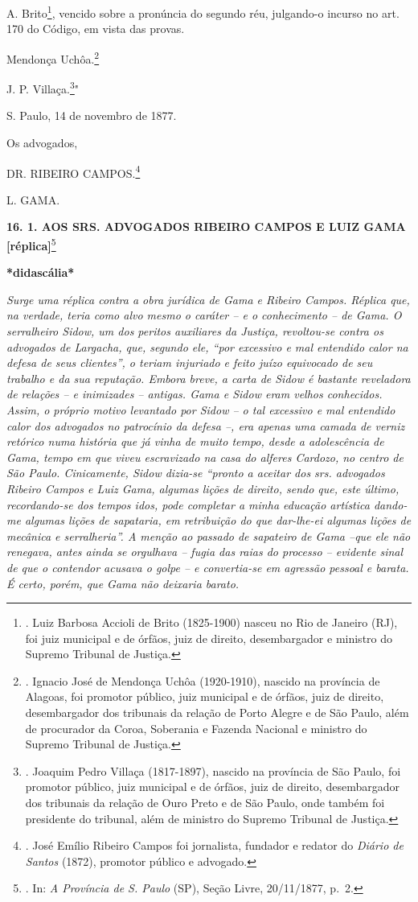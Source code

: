 A. Brito\footnote{. Luiz Barbosa Accioli de Brito (1825-1900) nasceu no
  Rio de Janeiro (RJ), foi juiz municipal e de órfãos, juiz de direito,
  desembargador e ministro do Supremo Tribunal de Justiça.}, vencido
sobre a pronúncia do segundo réu, julgando-o incurso no art. 170 do
Código, em vista das provas.

Mendonça Uchôa.\footnote{. Ignacio José de Mendonça Uchôa (1920-1910),
  nascido na província de Alagoas, foi promotor público, juiz municipal
  e de órfãos, juiz de direito, desembargador dos tribunais da relação
  de Porto Alegre e de São Paulo, além de procurador da Coroa, Soberania
  e Fazenda Nacional e ministro do Supremo Tribunal de Justiça.}

J. P. Villaça.\footnote{. Joaquim Pedro Villaça (1817-1897), nascido na
  província de São Paulo, foi promotor público, juiz municipal e de
  órfãos, juiz de direito, desembargador dos tribunais da relação de
  Ouro Preto e de São Paulo, onde também foi presidente do tribunal,
  além de ministro do Supremo Tribunal de Justiça.}"

S. Paulo, 14 de novembro de 1877.

Os advogados,

DR. RIBEIRO CAMPOS.\footnote{. José Emílio Ribeiro Campos foi
  jornalista, fundador e redator do \emph{Diário de Santos} (1872),
  promotor público e advogado.}

L. GAMA.

\textbf{16. 1. AOS SRS. ADVOGADOS RIBEIRO CAMPOS E LUIZ GAMA
{[}réplica{]}}\footnote{. In: \emph{A Província de S. Paulo} (SP), Seção
  Livre, 20/11/1877, p.~2.}

\textbf{*didascália*}

\emph{Surge uma réplica contra a obra jurídica de Gama e Ribeiro Campos.
Réplica que, na verdade, teria como alvo mesmo o caráter -- e o
conhecimento -- de Gama. O serralheiro Sidow, um dos peritos auxiliares
da Justiça, revoltou-se contra os advogados de Largacha, que, segundo
ele, ``por excessivo e mal entendido calor na defesa de seus clientes'',
o teriam injuriado e feito juízo equivocado de seu trabalho e da sua
reputação. Embora breve, a carta de Sidow é bastante reveladora de
relações -- e inimizades -- antigas. Gama e Sidow eram velhos
conhecidos. Assim, o próprio motivo levantado por Sidow -- o tal
excessivo e mal entendido calor dos advogados no patrocínio da defesa
--, era apenas uma camada de verniz retórico numa história que já vinha
de muito tempo, desde a adolescência de Gama, tempo em que viveu
escravizado na casa do alferes Cardozo, no centro de São Paulo.
Cinicamente, Sidow dizia-se ``pronto a aceitar dos srs. advogados
Ribeiro Campos e Luiz Gama, algumas lições de direito, sendo que, este
último, recordando-se dos tempos idos, pode completar a minha educação
artística dando-me algumas lições de sapataria, em retribuição do que
dar-lhe-ei algumas lições de mecânica e serralheria''. A menção ao
passado de sapateiro de Gama --que ele não renegava, antes ainda se
orgulhava -- fugia das raias do processo -- evidente sinal de que o
contendor acusava o golpe -- e convertia-se em agressão pessoal e
barata. É certo, porém, que Gama não deixaria barato. }

